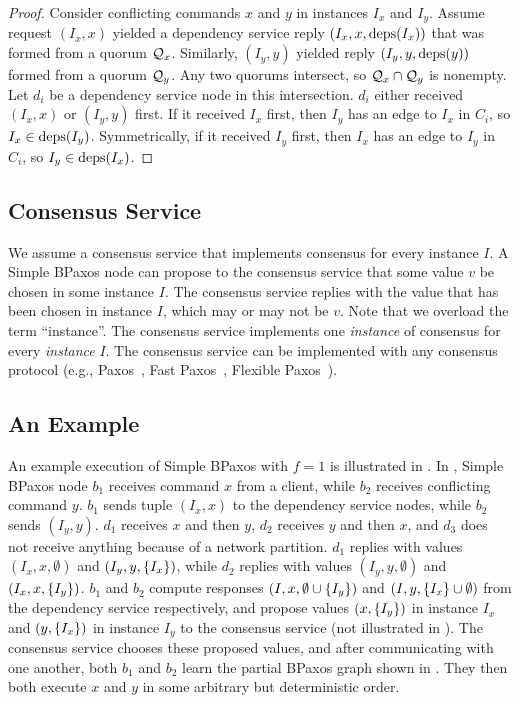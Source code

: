 \begin{proof}
  Consider conflicting commands $x$ and $y$ in instances $I_x$ and $I_y$.
  Assume request $(I_x, x)$ yielded a dependency service reply $(I_x, x,
  \text{deps}(I_x))$ that was formed from a quorum $\mathcal{Q}_x$. Similarly, $(I_y, y)$
  yielded reply $(I_y, y, \text{deps}(y))$ formed from a quorum $\mathcal{Q}_y$. Any two
  quorums intersect, so $\mathcal{Q}_x \cap \mathcal{Q}_y$ is nonempty. Let $d_i$ be a
  dependency service node in this intersection. $d_i$ either received $(I_x,
  x)$ or $(I_y, y)$ first. If it received $I_x$ first, then $I_y$ has an edge
  to $I_x$ in $C_i$, so $I_x \in \text{deps}(I_y)$.  Symmetrically, if it received
  $I_y$ first, then $I_x$ has an edge to $I_y$ in $C_i$, so $I_y \in
  \text{deps}(I_x)$.
\end{proof}

\subsection{Consensus Service}
We assume a consensus service that implements consensus for every instance $I$.
A Simple BPaxos node can propose to the consensus service that some value $v$
be chosen in some instance $I$. The consensus service replies with the value
that has been chosen in instance $I$, which may or may not be $v$. Note that we
overload the term ``instance''. The consensus service implements one
\emph{instance} of consensus for every \emph{instance} $I$. The consensus
service can be implemented with any consensus protocol (e.g.,
Paxos~\cite{lamport1998part, lamport2001paxos}, Fast
Paxos~\cite{lamport2006fast}, Flexible Paxos~\cite{howard2016flexible}).

\subsection{An Example}


An example execution of Simple BPaxos with $f=1$ is illustrated in
. In , Simple BPaxos
node $b_1$ receives command $x$ from a client, while $b_2$ receives conflicting
command $y$. $b_1$ sends tuple $(I_x, x)$ to the dependency service nodes,
while $b_2$ sends $(I_y, y)$. $d_1$ receives $x$ and then $y$, $d_2$ receives
$y$ and then $x$, and $d_3$ does not receive anything because of a network
partition. $d_1$ replies with values $(I_x, x, \emptyset)$ and $(I_y, y,
\{I_x\})$, while $d_2$ replies with values $(I_y, y, \emptyset)$ and $(I_x,
x, \{I_y\})$.  $b_1$ and $b_2$ compute responses $(I, x, \emptyset{} \cup
\{I_y\})$ and $(I, y, \{I_x\} \cup \emptyset{})$ from the dependency
service respectively, and propose values $(x, \{I_y\})$ in instance $I_x$ and
$(y, \{I_x\})$ in instance $I_y$ to the consensus service (not illustrated in
). The consensus service chooses these proposed
values, and after communicating with one another, both $b_1$ and $b_2$ learn
the partial BPaxos graph shown in .  They then
both execute $x$ and $y$ in some arbitrary but deterministic order.

